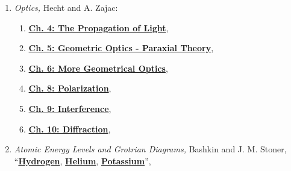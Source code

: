 \documentclass{../lab}
\begin{document}
\begin{enumerate}
    \item \emph{Optics,} Hecht and A. Zajac:
    \begin{enumerate}
        \item \href{http://physics111.lib.berkeley.edu/Physics111/Reprints/ATM/Optics\%20Hecht\%20&\%20Zajac/Ch.\%204\%20the\%20propagation\%20of\%20light.pdf}{\textbf{Ch. 4: The Propagation of Light}},
        
        \item \href{http://physics111.lib.berkeley.edu/Physics111/Reprints/ATM/Optics\%20Hecht\%20&\%20Zajac/Ch.\%205\%20geometric\%20optics\%20--\%20paraxial\%20theory.pdf}{\textbf{Ch. 5: Geometric Optics - Paraxial Theory}},
        
        \item \href{http://physics111.lib.berkeley.edu/Physics111/Reprints/ATM/Optics\%20Hecht\%20&\%20Zajac/Ch.\%206\%20more\%20on\%20geometrical\%20optics.pdf}{\textbf{Ch. 6: More Geometrical Optics}},
        
        \item \href{http://physics111.lib.berkeley.edu/Physics111/Reprints/ATM/Optics\%20Hecht\%20&\%20Zajac/Ch.\%208\%20polarization.pdf}{\textbf{Ch. 8: Polarization}},
        
        \item \href{http://physics111.lib.berkeley.edu/Physics111/Reprints/ATM/Optics\%20Hecht\%20&\%20Zajac/Ch.\%209\%20interference.pdf}{\textbf{Ch. 9: Interference}},
        
        \item \href{http://physics111.lib.berkeley.edu/Physics111/Reprints/ATM/Optics\%20Hecht\%20&\%20Zajac/Ch.\%2010\%20diffraction.pdf}{\textbf{Ch. 10: Diffraction}},
    \end{enumerate}
    
    \item \emph{Atomic Energy Levels and Grotrian Diagrams,} Bashkin and J. M. Stoner, ``\href{http://physics111.lib.berkeley.edu/Physics111/Reprints/ATM/Atomic\%20Energy\%20Levels\%20and\%20Grotrian\%20Diagrams/atomic\%20energy\%20levels\%20-\%20hydrogen\_OCR.pdf}{\textbf{Hydrogen}}, \href{http://physics111.lib.berkeley.edu/Physics111/Reprints/ATM/Atomic\%20Energy\%20Levels\%20and\%20Grotrian\%20Diagrams/atomic\%20energy\%20levels\%20-\%20helium\_OCR.pdf}{\textbf{Helium}}, \href{http://physics111.lib.berkeley.edu/Physics111/Reprints/ATM/Atomic\%20Energy\%20Levels\%20and\%20Grotrian\%20Diagrams/atomic\%20energy\%20levels\%20-\%20potassium\_OCR.pdf}{\textbf{Potassium}}'',
    

\end{enumerate}
\end{document}

